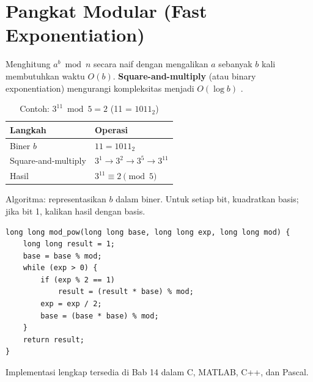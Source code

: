 \section{Pangkat Modular (Fast Exponentiation)}

Menghitung $a^b \bmod n$ secara naif dengan mengalikan $a$ sebanyak $b$ kali membutuhkan waktu $O(b)$. \textbf{Square-and-multiply} (atau binary exponentiation) mengurangi kompleksitas menjadi $O(\log b)$ \cite{menezes1996,stinson2018}.

\begin{table}[!htbp]
\centering
\caption{Contoh: $3^{11} \bmod 5 = 2$ (11 = $1011_2$)}
\label{tab:fast-exp}
\begin{tabular}{@{}ll@{}}
\toprule
\textbf{Langkah} & \textbf{Operasi} \\
\midrule
Biner $b$ & $11 = 1011_2$ \\
Square-and-multiply & $3^1 \to 3^2 \to 3^5 \to 3^{11}$ \\
Hasil & $3^{11} \equiv 2 \pmod{5}$ \\
\bottomrule
\end{tabular}
\end{table}

Algoritma: representasikan $b$ dalam biner. Untuk setiap bit, kuadratkan basis; jika bit 1, kalikan hasil dengan basis.

\begin{lstlisting}[style=cstyle,caption={Fast Modular Exponentiation dalam C}]
long long mod_pow(long long base, long long exp, long long mod) {
    long long result = 1;
    base = base % mod;
    while (exp > 0) {
        if (exp % 2 == 1)
            result = (result * base) % mod;
        exp = exp / 2;
        base = (base * base) % mod;
    }
    return result;
}
\end{lstlisting}

Implementasi lengkap tersedia di Bab 14 dalam C, MATLAB, C++, dan Pascal.
